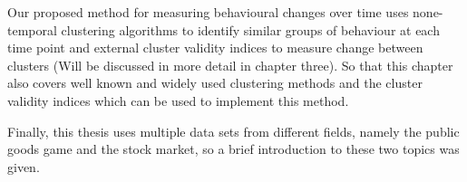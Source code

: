 Our proposed method for measuring behavioural changes over time uses none-temporal clustering algorithms to identify similar groups of behaviour at each time point and external cluster validity indices to measure change between clusters (Will be discussed in more detail in chapter three). So that this chapter also covers well known and widely used clustering methods and the cluster validity indices which can be used to implement this method. 



Finally, this thesis uses multiple data sets from different fields, namely the public goods game and the stock market, so a brief introduction to these two topics was given.



